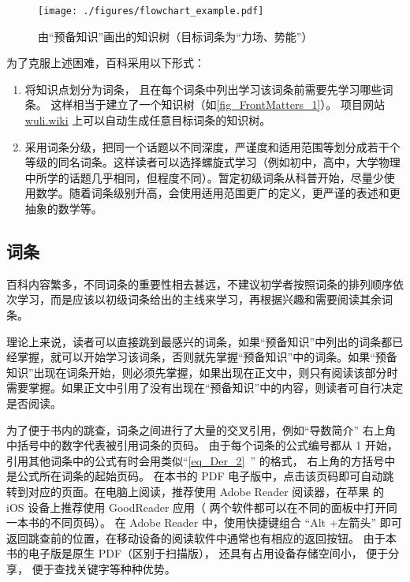 \begin{figure}[ht]
\centering
\texttt{[image: ./figures/flowchart\_example.pdf]}
\caption{由“预备知识”画出的知识树（目标词条为“力场、势能”）}\label{fig_FrontMatters_1}
\end{figure}

为了克服上述困难，百科采用以下形式：
\begin{enumerate}
\item 将知识点划分为词条， 且在每个词条中列出学习该词条前需要先学习哪些词条。 这样相当于建立了一个知识树（如\autoref{fig_FrontMatters_1}）。 项目网站 \href{https://wuli.wiki}{wuli.wiki} 上可以自动生成任意目标词条的知识树。
\item 采用词条分级，把同一个话题以不同深度，严谨度和适用范围等划分成若干个等级的同名词条。这样读者可以选择螺旋式学习（例如初中，高中，大学物理中所学的话题几乎相同，但程度不同）。暂定初级词条从科普开始，尽量少使用数学。随着词条级别升高，会使用适用范围更广的定义，更严谨的表述和更抽象的数学等。
\end{enumerate}

\subsection{词条}
百科内容繁多，不同词条的重要性相去甚远，不建议初学者按照词条的排列顺序依次学习，而是应该以初级词条给出的主线来学习，再根据兴趣和需要阅读其余词条。

理论上来说，读者可以直接跳到最感兴的词条，如果“预备知识”中列出的词条都已经掌握，就可以开始学习该词条，否则就先掌握“预备知识”中的词条。如果“预备知识”出现在词条开始，则必须先掌握，如果出现在正文中，则只有阅读该部分时需要掌握。如果正文中引用了没有出现在“预备知识”中的内容，则读者可自行决定是否阅读。

为了便于书内的跳查，词条之间进行了大量的交叉引用，例如“导数简介” 右上角中括号中的数字代表被引用词条的页码。 由于每个词条的公式编号都从 1 开始， 引用其他词条中的公式有时会用类似“\autoref{eq_Der_2}~” 的格式， 右上角的方括号中是公式所在词条的起始页码。 在本书的 PDF 电子版中，点击该页码即可自动跳转到对应的页面。在电脑上阅读，推荐使用 Adobe Reader 阅读器，在苹果\textsuperscript{\textregistered} 的 iOS 设备上推荐使用 GoodReader 应用（ 两个软件都可以在不同的面板中打开同一本书的不同页码）。 在 Adobe Reader 中，使用快捷键组合 “Alt +左箭头” 即可返回跳查前的位置，在移动设备的阅读软件中通常也有相应的返回按钮。 由于本书的电子版是原生 PDF（区别于扫描版）， 还具有占用设备存储空间小， 便于分享， 便于查找关键字等种种优势。



